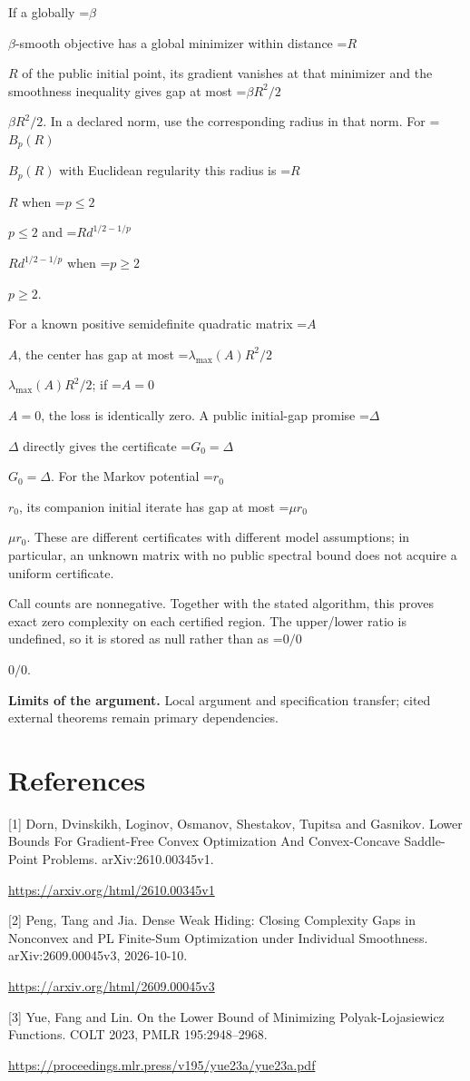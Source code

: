 \documentclass[10pt,a4paper]{article}
\newcommand{\AtlasMath}[1]{\par\begingroup\centering\setbox0=\hbox{$\displaystyle #1$}\ifdim\wd0>1.4\linewidth\typeout{ATLAS WIDE FORMULA: \the\wd0}\fi\ifdim\wd0>\linewidth\resizebox{\linewidth}{!}{\box0}\else\box0\fi\par\endgroup}
\newcommand{\AtlasInlineMath}[1]{\begingroup\setbox0=\hbox{$#1$}\ifdim\wd0>.4\linewidth\endgroup\AtlasMath{#1}\else\endgroup$#1$\fi}
\begin{document}
If a globally \AtlasInlineMath{\beta}-smooth objective has a global minimizer within distance \AtlasInlineMath{R} of the public initial point, its gradient vanishes at that minimizer and the smoothness inequality gives gap at most \AtlasInlineMath{\beta R^2/2}. In a declared norm, use the corresponding radius in that norm. For \AtlasInlineMath{B_p(R)} with Euclidean regularity this radius is \AtlasInlineMath{R} when \AtlasInlineMath{p\le2} and \AtlasInlineMath{R d^{1/2-1/p}} when \AtlasInlineMath{p\ge2}.

For a known positive semidefinite quadratic matrix \AtlasInlineMath{A}, the center has gap at most \AtlasInlineMath{\lambda_{\max}(A)R^2/2}; if \AtlasInlineMath{A=0}, the loss is identically zero. A public initial-gap promise \AtlasInlineMath{\Delta} directly gives the certificate \AtlasInlineMath{G_0=\Delta}. For the Markov potential \AtlasInlineMath{r_0}, its companion initial iterate has gap at most \AtlasInlineMath{\mu r_0}. These are different certificates with different model assumptions; in particular, an unknown matrix with no public spectral bound does not acquire a uniform certificate.

Call counts are nonnegative. Together with the stated algorithm, this proves exact zero complexity on each certified region. The upper/lower ratio is undefined, so it is stored as null rather than as \AtlasInlineMath{0/0}.

\textbf{Limits of the argument.} Local argument and specification transfer; cited external theorems remain primary dependencies.

\section{References}
[1] Dorn, Dvinskikh, Loginov, Osmanov, Shestakov, Tupitsa and Gasnikov. Lower Bounds For Gradient-Free Convex Optimization And Convex-Concave Saddle-Point Problems. arXiv:2610.00345v1.

\url{https://arxiv.org/html/2610.00345v1}

[2] Peng, Tang and Jia. Dense Weak Hiding: Closing Complexity Gaps in Nonconvex and PL Finite-Sum Optimization under Individual Smoothness. arXiv:2609.00045v3, 2026-10-10.

\url{https://arxiv.org/html/2609.00045v3}

[3] Yue, Fang and Lin. On the Lower Bound of Minimizing Polyak-Lojasiewicz Functions. COLT 2023, PMLR 195:2948--2968.

\url{https://proceedings.mlr.press/v195/yue23a/yue23a.pdf}
\end{document}
